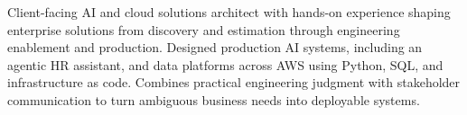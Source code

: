 

\begin{cvparagraph}

Client-facing AI and cloud solutions architect with hands-on experience shaping enterprise solutions from discovery and estimation through engineering enablement and production. Designed production AI systems, including an agentic HR assistant, and data platforms across AWS using Python, SQL, and infrastructure as code. Combines practical engineering judgment with stakeholder communication to turn ambiguous business needs into deployable systems.
\end{cvparagraph}
